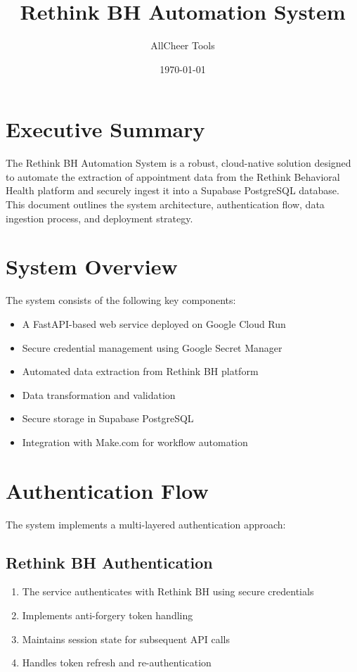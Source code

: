 \documentclass[11pt,a4paper]{article}
\title{Rethink BH Automation System}
\author{AllCheer Tools}
\date{\today}
\begin{document}
\maketitle
\tableofcontents
\newpage

\section{Executive Summary}
The Rethink BH Automation System is a robust, cloud-native solution designed to automate the extraction of appointment data from the Rethink Behavioral Health platform and securely ingest it into a Supabase PostgreSQL database. This document outlines the system architecture, authentication flow, data ingestion process, and deployment strategy.

\section{System Overview}
The system consists of the following key components:
\begin{itemize}
    \item A FastAPI-based web service deployed on Google Cloud Run
    \item Secure credential management using Google Secret Manager
    \item Automated data extraction from Rethink BH platform
    \item Data transformation and validation
    \item Secure storage in Supabase PostgreSQL
    \item Integration with Make.com for workflow automation
\end{itemize}

\section{Authentication Flow}
The system implements a multi-layered authentication approach:

\subsection{Rethink BH Authentication}
\begin{enumerate}
    \item The service authenticates with Rethink BH using secure credentials
    \item Implements anti-forgery token handling
    \item Maintains session state for subsequent API calls
    \item Handles token refresh and re-authentication
\end{enumerate}
\end{document}
